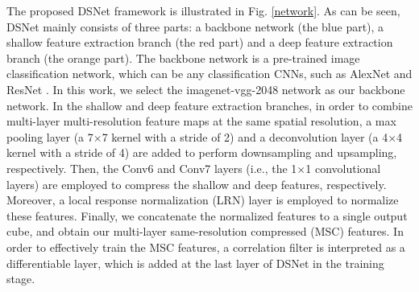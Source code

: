 \documentclass[runningheads]{llncs}
\begin{document}
The proposed DSNet framework is illustrated in Fig. \ref{network}. As can be seen, DSNet mainly consists of three parts: a backbone network (the blue part), a shallow feature extraction branch (the red part) and a deep feature extraction branch (the orange part). The backbone network is a pre-trained image classification network, which can be any classification CNNs, such as AlexNet \cite{Alexnet} and ResNet \cite{Resnet}. In this work, we select the imagenet-vgg-2048 network \cite{VGG-M} as our backbone network. In the shallow and deep feature extraction branches, in order to combine multi-layer multi-resolution feature maps at the same spatial resolution, a max pooling layer (a 7$\times$7 kernel with a stride of 2) and a deconvolution layer \cite{Deconv} (a 4$\times$4 kernel with a stride of 4) are added to perform downsampling and upsampling, respectively. Then, the Conv6 and Conv7 layers (i.e., the 1$\times$1 convolutional layers) are employed to compress the shallow and deep features, respectively. Moreover, a local response normalization (LRN) layer \cite{Alexnet}  is employed to normalize these features. Finally, we concatenate the normalized features to a single output cube, and obtain our multi-layer same-resolution compressed (MSC) features. In order to effectively train the MSC features, a correlation filter is interpreted as a differentiable layer, which is added at the last layer of DSNet in the training stage.
 

\end{document}
